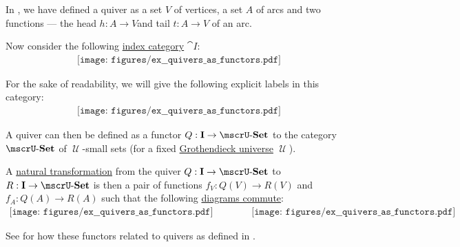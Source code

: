 \begin{example}\label{ex:quivers_as_functors}
  In , we have defined a quiver as a set \( V \) of vertices, a set \( A \) of arcs and two functions --- the head \( h: A \to V \)and tail \( t: A \to V \) of an arc.

  Now consider the following \hyperref[rem:categorical_diagram_as_functor]{index category} \( \cat{I}: \)
  \begin{equation}\label{eq:ex:quivers_as_functors/index/dots}
    \begin{aligned}
      \texttt{[image: figures/ex\_\_quivers\_as\_functors.pdf]}
    \end{aligned}
  \end{equation}

  For the sake of readability, we will give the following explicit labels in this category:
  \begin{equation}\label{eq:ex:quivers_as_functors/index/annotated}
    \begin{aligned}
      \texttt{[image: figures/ex\_\_quivers\_as\_functors.pdf]}
    \end{aligned}
  \end{equation}

  A quiver can then be defined as a functor \( Q: \cat{I} \to \ucat{Set} \) to the category \hyperref[def:category_of_small_sets]{\( \ucat{Set} \)} of \( \mscrU \)-small sets (for a fixed \hyperref[def:grothendieck_universe]{Grothendieck universe} \( \mscrU \)).

  A \hyperref[def:natural_transformation]{natural transformation} from the quiver \( Q: \cat{I} \to \ucat{Set} \) to \( R: \cat{I} \to \ucat{Set} \) is then a pair of functions \( f_V: Q(V) \to R(V) \) and \( f_A: Q(A) \to R(A) \) such that the following \hyperref[def:categorical_diagram]{diagrams commute}:
  \begin{equation}\label{eq:ex:quivers_as_functors/index/diagram}
    \begin{aligned}
      \texttt{[image: figures/ex\_\_quivers\_as\_functors.pdf]}
      \quad\quad\quad\quad
      \texttt{[image: figures/ex\_\_quivers\_as\_functors.pdf]}
    \end{aligned}
  \end{equation}

  See  for how these functors related to quivers as defined in .
\end{example}

